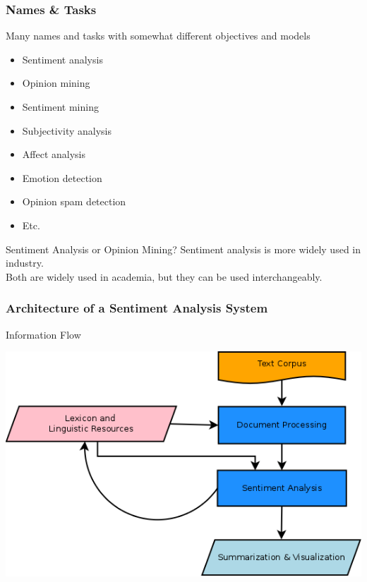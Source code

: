 \documentclass[t]{beamer}
\begin{document}
\begin{frame} \frametitle{Names \& Tasks} %

Many names and tasks with somewhat different objectives and models
       
\begin{itemize}
\item Sentiment analysis 
\item  Opinion mining 
\item  Sentiment mining 
\item  Subjectivity analysis 
\item  Affect analysis 
\item  Emotion detection 
\item  Opinion spam detection 
\item  Etc.
\end{itemize}

\begin{block}{Sentiment Analysis or Opinion Mining?}
Sentiment analysis is more widely used in industry. \\
Both are widely used in academia, but they can be used interchangeably.
\end{block}

\end{frame} 



\begin{frame} \frametitle{Architecture of a Sentiment Analysis System} %

\begin{block}{Information Flow} 

\begin{center}
     \includegraphics[width=\textwidth]{sentiment-analysis-flow}
\end{center}

\end{block}

\end{frame}
\end{document}
